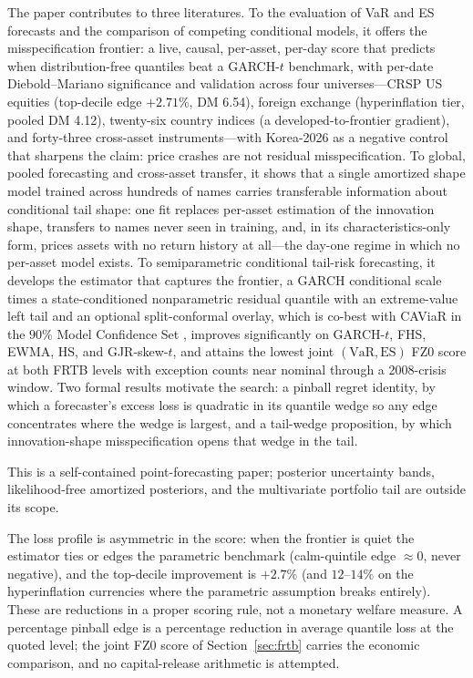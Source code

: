 \documentclass[11pt]{article}
\newcommand{\VaR}{\mathrm{VaR}}
\newcommand{\ES}{\mathrm{ES}}
\theoremstyle{remark}
\begin{document}
\medskip\noindent The paper contributes to three literatures. To the
evaluation of VaR and ES forecasts and the comparison of competing
conditional models, it offers the misspecification frontier: a live,
causal, per-asset, per-day score that predicts when distribution-free
quantiles beat a GARCH-$t$ benchmark, with per-date Diebold--Mariano
significance and validation across four universes---CRSP US equities
(top-decile edge $+2.71\%$, DM 6.54), foreign exchange (hyperinflation
tier, pooled DM 4.12), twenty-six country indices (a
developed-to-frontier gradient), and forty-three cross-asset
instruments---with Korea-2026 as a negative control that sharpens the
claim: price crashes are not residual misspecification. To global,
pooled forecasting and cross-asset transfer, it shows that a single
amortized shape model trained across hundreds of names carries
transferable information about conditional tail shape: one fit replaces
per-asset estimation of the innovation shape, transfers to names never
seen in training, and, in its characteristics-only form, prices assets
with no return history at all---the day-one regime in which no
per-asset model exists. To semiparametric conditional tail-risk
forecasting, it develops the estimator that captures the frontier, a
GARCH conditional scale times a state-conditioned nonparametric
residual quantile with an extreme-value left tail and an optional
split-conformal overlay, which is co-best with CAViaR
\citep{engle2004caviar} in the $90\%$ Model Confidence Set
\citep{hansen2011mcs}, improves significantly on GARCH-$t$, FHS, EWMA,
HS, and GJR-skew-$t$, and attains the lowest joint $(\VaR,\ES)$ FZ0
score at both FRTB levels with exception counts near nominal through a
2008-crisis window. Two formal results motivate the search: a pinball
regret identity, by which a forecaster's excess loss is quadratic in
its quantile wedge so any edge concentrates where the wedge is largest,
and a tail-wedge proposition, by which innovation-shape misspecification
opens that wedge in the tail.

\medskip
\noindent This is a self-contained point-forecasting paper; posterior
uncertainty bands, likelihood-free amortized posteriors, and the
multivariate portfolio tail are outside its scope.

The loss profile is asymmetric in the score: when the frontier is
quiet the estimator ties or edges the parametric benchmark (calm-quintile
edge $\approx 0$, never negative), and the top-decile improvement is
$+2.7\%$ (and $12$--$14\%$ on the hyperinflation currencies where the
parametric assumption breaks entirely). These are reductions in a
proper scoring rule, not a monetary welfare measure. A
percentage pinball edge is a percentage reduction in average quantile
loss at the quoted level; the joint FZ0 score of
Section~\ref{sec:frtb} carries the economic comparison, and no
capital-release arithmetic is attempted.
\end{document}
